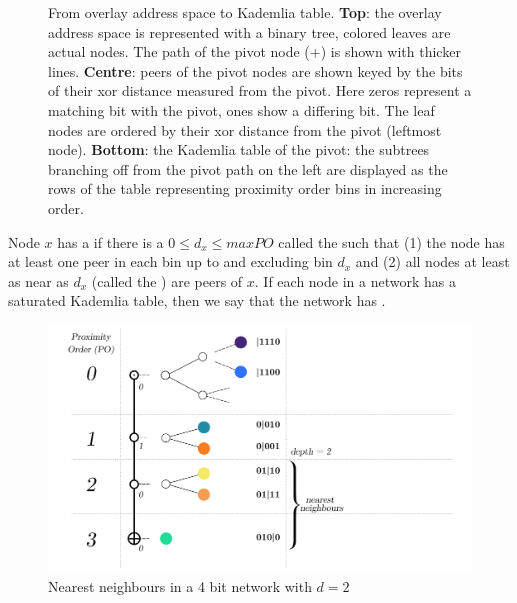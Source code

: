 \begin{figure}[htbp]
   \caption[From overlay address space to Kademlia table \statusgreen]{From overlay address space to Kademlia table. \textbf{Top}: the overlay address space is represented with a binary tree, colored leaves are actual nodes. The path of the pivot node (+) is shown with thicker lines. \textbf{Centre}: peers of the pivot nodes are shown keyed by the bits of their xor distance measured from the pivot. Here zeros represent a matching bit with the pivot, ones show a differing bit. The leaf nodes are ordered by their xor distance from the pivot (leftmost node). \textbf{Bottom}: the Kademlia table of the pivot: the subtrees branching off from the pivot path on the left are displayed as the rows of the table representing proximity order bins in increasing order.}
   \label{fig:kademlia-table}
\end{figure}

Node $x$ has a  if there is a $0\leq d_x\leq \mathit{maxPO}$ called the   such that (1) the node has at least one peer in each bin up to and excluding  bin $d_x$ and (2) all nodes at least as near as $d_x$ (called the ) are peers of $x$. If each node in a network has a saturated Kademlia table, then we say that the network has .

\begin{figure}[htbp]
   \centering
    \includegraphics[width=\textwidth]{fig/kademlia-3.pdf}
   \caption[Nearest neighbours \statusgreen]{Nearest neighbours in a 4 bit network with $d = 2$ }
   \label{fig:bin-density}
\end{figure}

